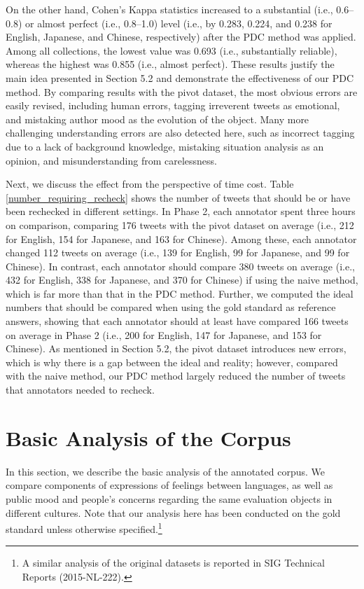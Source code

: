 \documentclass[english]{jnlp_1.4}
\begin{document}
On the other hand, Cohen's Kappa statistics increased to a substantial (i.e., 0.6--0.8) or almost perfect (i.e., 0.8--1.0) level (i.e., by 0.283, 0.224, and 0.238 for English, Japanese, and Chinese, respectively) after the PDC method was applied. Among all collections, the lowest value was 0.693 (i.e., substantially reliable), whereas the highest was 0.855 (i.e., almost perfect). These results justify the main idea presented in Section 5.2 and demonstrate the effectiveness of our PDC method. By comparing results with the pivot dataset, the most obvious errors are easily revised, including human errors, tagging irreverent tweets as emotional, and mistaking author mood as the evolution of the object. Many more challenging understanding errors are also detected here, such as incorrect tagging due to a lack of background knowledge, mistaking situation analysis as an opinion, and misunderstanding from carelessness.

Next, we discuss the effect from the perspective of time cost. Table \ref{number_requiring_recheck} shows the number of tweets that should be or have been rechecked in different settings. In Phase 2, each annotator spent three hours on comparison, comparing 176 tweets with the pivot dataset on average (i.e., 212 for English, 154 for Japanese, and 163 for Chinese). Among these, each annotator changed 112 tweets on average (i.e., 139 for English, 99 for Japanese, and 99 for Chinese). In contrast, each annotator should compare 380 tweets on average (i.e., 432 for English, 338 for Japanese, and 370 for Chinese) if using the naive method, which is far more than that in the PDC method. Further, we computed the ideal numbers that should be compared when using the gold standard as reference answers, showing that each annotator should at least have compared 166 tweets on average in Phase 2 (i.e., 200 for English, 147 for Japanese, and 153 for Chinese). As mentioned in Section 5.2, the pivot dataset introduces new errors, which is why there is a gap between the ideal and reality; however, compared with the naive method, our PDC method largely reduced the number of tweets that annotators needed to recheck.


\section{Basic Analysis of the Corpus}

In this section, we describe the basic analysis of the annotated corpus. We compare components of expressions of feelings between languages, as well as public mood and people's concerns regarding the same evaluation objects in different cultures. Note that our analysis here has been conducted on the gold standard unless otherwise specified.\footnote{A similar analysis of the original datasets is reported in SIG Technical Reports (2015-NL-222).}
\end{document}
